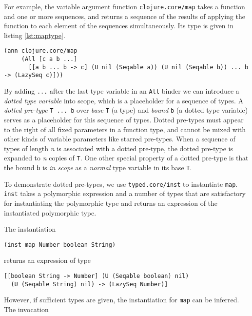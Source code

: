 For example, the variable argument function \lstinline|clojure.core/map| takes a function and one or more sequences,
and returns a sequence of the results of applying the function to each element of the sequences simultaneously.
Its type is given in listing \ref{lst:maptype}.

\begin{lstlisting}[caption=Type signature for \lstinline|clojure.core/map|, label=lst:maptype]
(ann clojure.core/map
     (All [c a b ...]
       [[a b ... b -> c] (U nil (Seqable a)) (U nil (Seqable b)) ... b -> (LazySeq c)]))
\end{lstlisting}

By adding \lstinline|...| after the last type variable in an \lstinline|All| binder
we can introduce a \emph{dotted type variable} into scope, which is a placeholder for a sequence of types.
A \emph{dotted pre-type} \lstinline|T ... b| over \emph{base} \lstinline|T| (a type) and \emph{bound}
\lstinline|b| (a dotted type variable)
serves as a placeholder for this sequence of types.
Dotted pre-types must appear to the right of all fixed parameters in a function type,
and cannot be mixed with other kinds of variable parameters like starred pre-types.
When a sequence of types of length \emph{n} is associated with a dotted pre-type, 
the dotted pre-type is expanded to \emph{n} copies of \lstinline|T|.
One other special property of a dotted pre-type is that the bound \lstinline|b|
is \emph{in scope} as a \emph{normal} type variable in its base \lstinline|T|.

To demonstrate dotted pre-types, we use \lstinline|typed.core/inst| to instantiate
\lstinline|map|. \lstinline|inst| takes a polymorphic expression and a number of types
that are satisfactory for instantiating the polymorphic type and returns an expression
of the instantiated polymorphic type.

The instantiation

\begin{lstlisting}
(inst map Number boolean String)
\end{lstlisting}

returns an expression of type

\begin{lstlisting}
[[boolean String -> Number] (U (Seqable boolean) nil) 
  (U (Seqable String) nil) -> (LazySeq Number)]
\end{lstlisting}

However, if sufficient types are given, the instantiation for \lstinline|map| can be inferred.
The invocation

